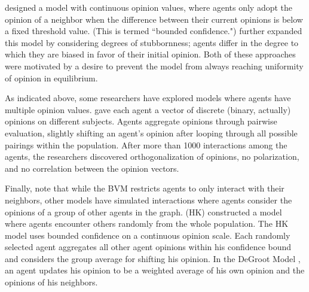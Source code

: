 \cite{weisbuch_interacting_2001} designed a model with continuous opinion
values, where agents only adopt the opinion of a neighbor when the difference
between their current opinions is below a fixed threshold value. (This is
termed ``bounded confidence.") \cite{ghaderi_opinion_2012} further expanded
this model by considering degrees of stubbornness; agents differ in the degree
to which they are biased in favor of their initial opinion. Both of these
approaches were motivated by a desire to prevent the model from always
reaching uniformity of opinion in equilibrium.

As indicated above, some researchers
have explored models where agents have multiple opinion values.
\cite{deffuant_mixing_2000} gave each agent a vector of discrete (binary,
actually) opinions on different subjects. Agents aggregate opinions through pairwise
evaluation, 
slightly shifting an agent's opinion after looping through all possible
pairings within the population. After more than 1000 interactions among the
agents, the researchers discovered orthogonalization of opinions, no
polarization, and no correlation between the opinion vectors.


Finally, note that while the BVM restricts agents to only interact with their
neighbors, other models have simulated interactions where agents consider the
opinions of a group of other agents in the graph.
\cite{hegselmann_opinion_2002} (HK) constructed a model where agents encounter
others randomly from the whole population. The HK model uses bounded
confidence on a continuous opinion scale. Each randomly selected agent
aggregates all other agent opinions within his confidence bound and considers
the group average for shifting his opinion. In the DeGroot Model
\cite{degroot_reaching_1974}, an agent updates his opinion to be a weighted
average of his own opinion and the opinions of his neighbors.
 

